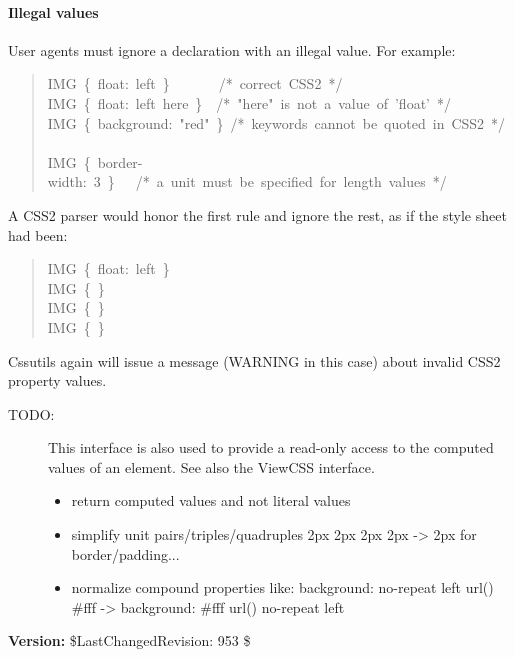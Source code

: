 
\hypertarget{illegal-values}{}
\paragraph*{Illegal values}
\label{illegal-values}

User agents must ignore a declaration with an illegal value. For example:
\begin{quote}{\ttfamily \raggedright \noindent
IMG~{\{}~float:~left~{\}}~~~~~~~/*~correct~CSS2~*/~\\
IMG~{\{}~float:~left~here~{\}}~~/*~"here"~is~not~a~value~of~'float'~*/~\\
IMG~{\{}~background:~"red"~{\}}~/*~keywords~cannot~be~quoted~in~CSS2~*/~\\
IMG~{\{}~border-width:~3~{\}}~~~/*~a~unit~must~be~specified~for~length~values~*/
}\end{quote}

A CSS2 parser would honor the first rule and ignore the rest, as if the
style sheet had been:
\begin{quote}{\ttfamily \raggedright \noindent
IMG~{\{}~float:~left~{\}}~\\
IMG~{\{}~{\}}~\\
IMG~{\{}~{\}}~\\
IMG~{\{}~{\}}
}\end{quote}

Cssutils again will issue a message (WARNING in this case) about invalid
CSS2 property values.
\begin{description}
\item[{TODO:}] \leavevmode 
This interface is also used to provide a read-only access to the
computed values of an element. See also the ViewCSS interface.
\begin{itemize}
\item {} 
return computed values and not literal values

\item {} 
simplify unit pairs/triples/quadruples
2px 2px 2px 2px -{\textgreater} 2px for border/padding...

\item {} 
normalize compound properties like:
background: no-repeat left url()  {\#}fff
-{\textgreater} background: {\#}fff url() no-repeat left

\end{itemize}

\end{description}
\textbf{Version:} \$LastChangedRevision: 953 \$



